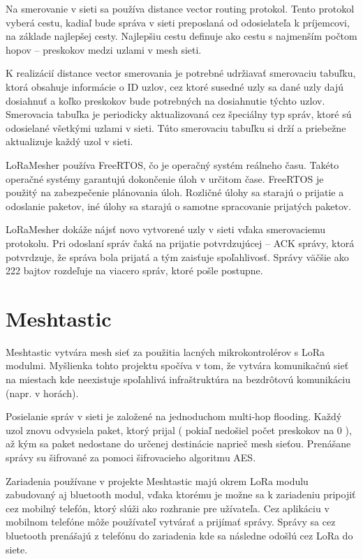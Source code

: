 \documentclass[slovak,master]{diploma}
\begin{document}
Na smerovanie v sieti sa používa distance vector routing protokol. Tento protokol vyberá cestu, kadiaľ bude správa v sieti preposlaná od odosielateľa k príjemcovi, na základe 
najlepšej cesty. Najlepšiu cestu definuje ako cestu s najmenším počtom hopov -- preskokov medzi uzlami v mesh sieti.

K realizácií distance vector smerovania je potrebné udržiavať smerovaciu tabuľku, ktorá obsahuje informácie o ID uzlov, cez ktoré susedné uzly sa dané uzly dajú dosiahnuť a 
koľko preskokov bude potrebných na dosiahnutie týchto uzlov. Smerovacia tabuľka je periodicky aktualizovaná cez špeciálny typ správ, ktoré sú odosielané 
všetkými uzlami v sieti. Túto smerovaciu tabuľku si drží a priebežne aktualizuje každý uzol v sieti.

LoRaMesher používa FreeRTOS, čo je operačný systém reálneho času. Takéto operačné systémy garantujú dokončenie úloh v určitom čase.
FreeRTOS je použitý na zabezpečenie plánovania úloh. Rozličné úlohy sa starajú o prijatie a odoslanie paketov, iné úlohy sa starajú o samotne 
spracovanie prijatých paketov.

LoRaMesher dokáže nájsť novo vytvorené uzly v sieti vďaka smerovaciemu protokolu. Pri odoslaní správ čaká na prijatie potvrdzujúcej -- ACK správy, ktorá potvrdzuje, 
že správa bola prijatá a tým zaisťuje spoľahlivosť. Správy väčšie ako 222 bajtov rozdeľuje na viacero správ, ktoré pošle postupne.

\section{Meshtastic}
Meshtastic \cite{meshtastic} vytvára mesh sieť za použitia lacných mikrokontrolérov s LoRa modulmi.
Myšlienka tohto projektu spočíva v tom, že vytvára komunikačnú sieť na miestach kde neexistuje spoľahlivá infraštruktúra na bezdrôtovú komunikáciu (napr. v horách).

Posielanie správ v sieti je založené na jednoduchom multi-hop flooding.
Každý uzol znovu odvysiela paket, ktorý prijal ( pokiaľ nedošiel počet preskokov na 0 ), až kým sa paket nedostane do určenej destinácie naprieč mesh sieťou.
Prenášane správy su šifrované za pomoci šifrovacieho algoritmu AES.

Zariadenia používane v projekte Meshtastic majú okrem LoRa modulu zabudovaný aj bluetooth modul, vďaka ktorému je možne sa k zariadeniu pripojiť cez mobilný telefón, ktorý slúži ako rozhranie pre 
užívateľa. Cez aplikáciu v mobilnom telefóne môže používateľ vytvárať a prijímať správy. Správy sa cez bluetooth prenášajú z telefónu do zariadenia kde sa následne odošlú cez 
LoRa do siete.
\end{document}
